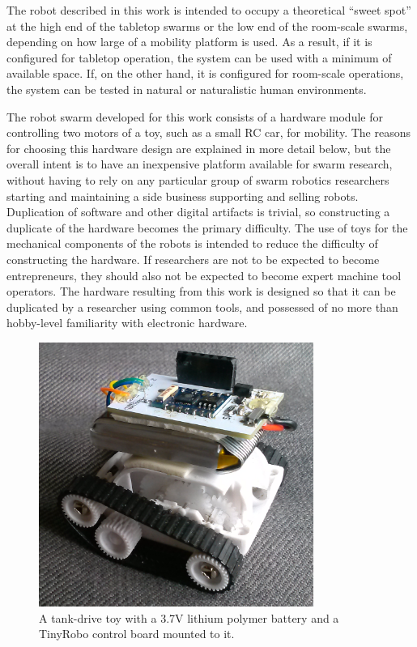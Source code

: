 \documentclass[]{article}
\begin{document}
The robot described in this work is intended to occupy a theoretical ``sweet spot'' at the high end of the tabletop swarms or the low end of the room-scale swarms, depending on how large of a mobility platform is used. 
As a result, if it is configured for tabletop operation, the system can be used with a minimum of available space. 
If, on the other hand, it is configured for room-scale operations, the system can be tested in natural or naturalistic human environments. 

The robot swarm developed for this work consists of a hardware module for controlling two motors of a toy, such as a small RC car, for mobility. 
The reasons for choosing this hardware design are explained in more detail below, but the overall intent is to have an inexpensive platform available for swarm research, without having to rely on any particular group of swarm robotics researchers starting and maintaining a side business supporting and selling robots.
Duplication of software and other digital artifacts is trivial, so constructing a duplicate of the hardware becomes the primary difficulty. 
The use of toys for the mechanical components of the robots is intended to reduce the difficulty of constructing the hardware. 
If researchers are not to be expected to become entrepreneurs, they should also not be expected to become expert machine tool operators.
The hardware resulting from this work is designed so that it can be duplicated by a researcher using common tools, and possessed of no more than hobby-level familiarity with electronic hardware.

\begin{figure}
\centering
\includegraphics[width=0.8\textwidth]{../robot_makers_2/tiny_tank}
\caption{A tank-drive toy with a 3.7V lithium polymer battery and a TinyRobo control board mounted to it.}
\end{figure}
\end{document}
